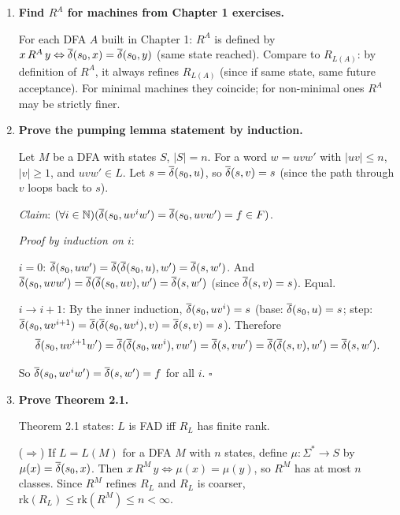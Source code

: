 \begin{enumerate}[{2.}1.]
$R^P$ is defined by $x\,R^P\,y\Leftrightarrow\DBAR(s_0,x)=\DBAR(s_0,y)$. Since the machine $P$ in Example 2.6 is the minimal machine for $L$, each state is reachable and distinguishable. The relation $R^P$ has the same classes as $R_L$ (each state corresponds to one $R_L$-class). Hence $R^P=R_L$.

\item \textbf{Find $R^A$ for machines from Chapter 1 exercises.}

For each DFA $A$ built in Chapter 1: $R^A$ is defined by $x\,R^A\,y\Leftrightarrow\overline{\delta}(s_0,x)=\overline{\delta}(s_0,y)$ (same state reached). Compare to $R_{L(A)}$: by definition of $R^A$, it always refines $R_{L(A)}$ (since if same state, same future acceptance). For minimal machines they coincide; for non-minimal ones $R^A$ may be strictly finer.

\item \textbf{Prove the pumping lemma statement by induction.}

Let $M$ be a DFA with states $S$, $|S|=n$. For a word $w=uvw'$ with $|uv|\leq n$, $|v|\geq 1$, and $uvw'\in L$. Let $s=\overline{\delta}(s_0,u)$, so $\overline{\delta}(s,v)=s$ (since the path through $v$ loops back to $s$).

\textit{Claim}: $(\forall i\in\mathbb{N})(\overline{\delta}(s_0,uv^iw')=\overline{\delta}(s_0,uvw')=f\in F)$.

\textit{Proof by induction on $i$}:

$i=0$: $\overline{\delta}(s_0,uw')=\overline{\delta}(\overline{\delta}(s_0,u),w')=\overline{\delta}(s,w')$. And $\overline{\delta}(s_0,uvw')=\overline{\delta}(\overline{\delta}(s_0,uv),w')=\overline{\delta}(s,w')$ (since $\overline{\delta}(s,v)=s$). Equal. \checkmark

$i\to i+1$: By the inner induction, $\overline{\delta}(s_0,uv^i)=s$ (base: $\overline{\delta}(s_0,u)=s$; step: $\overline{\delta}(s_0,uv^{i+1})=\overline{\delta}(\overline{\delta}(s_0,uv^i),v)=\overline{\delta}(s,v)=s$). Therefore
\[
\overline{\delta}(s_0,uv^{i+1}w')=\overline{\delta}(\overline{\delta}(s_0,uv^i),vw')=\overline{\delta}(s,vw')=\overline{\delta}(\overline{\delta}(s,v),w')=\overline{\delta}(s,w').
\]

So $\overline{\delta}(s_0,uv^iw')=\overline{\delta}(s,w')=f$ for all $i$. $\square$

\item \textbf{Prove Theorem 2.1.}

Theorem 2.1 states: $L$ is FAD iff $R_L$ has finite rank.

($\Rightarrow$) If $L=L(M)$ for a DFA $M$ with $n$ states, define $\mu: \Sigma^*\to S$ by $\mu(x)=\overline{\delta}(s_0,x)$. Then $x\,R^M\,y\Leftrightarrow\mu(x)=\mu(y)$, so $R^M$ has at most $n$ classes. Since $R^M$ refines $R_L$ and $R_L$ is coarser, $\mathrm{rk}(R_L)\leq\mathrm{rk}(R^M)\leq n<\infty$.


\end{enumerate}
